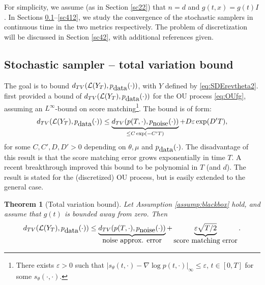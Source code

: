 \documentclass[letterpaper,11pt,reqno]{amsart}
\newtheorem{theorem}{Theorem}[section]
\numberwithin{equation}{section}
\begin{document}
\quad For simplicity, we assume (as in Section \ref{sc22}) that
$n = d$ and $g(t,x) = g(t) I$.
In Sections \ref{sc411}--\ref{sc412},
we study the convergence of the stochastic samplers in continuous time
in the two metrics respectively.
The problem of discretization will be discussed in Section \ref{sc42}, 
with additional references given.


\subsection{Stochastic sampler -- total variation bound}
\label{sc411}

The goal is to bound $d_{TV}(\mathcal{L}(Y_T), p_{\tiny \mbox{data}}(\cdot))$,
with $Y$ defined by \eqref{eq:SDErevtheta2}.
\cite{DV21} first provided a bound of $d_{TV}(\mathcal{L}(Y_T), p_{\tiny \mbox{data}}(\cdot))$ 
for the OU process \eqref{eq:OUfg}, 
assuming an $L^{\infty}$-bound on score matching\footnote{There exists $\varepsilon > 0$ such that 
$|s_\theta(t,\cdot) - \nabla \log p(t,\cdot)|_\infty \le \varepsilon$, $t \in [0,T]$
for some $s_\theta(\cdot, \cdot)$.}.
The bound is of form:
\begin{equation}
\label{eq:expTbad}
d_{TV}(\mathcal{L}(Y_T), p_{\tiny \mbox{data}}(\cdot))  \le \underbrace{d_{TV}(p(T, \cdot), p_{\tiny \mbox{noise}}(\cdot))}_{ \le C \exp(-C'T)} + D \varepsilon \exp(D' T),
\end{equation}
for some $C, C', D, D'> 0$ depending on $\theta, \mu$ and $p_{\tiny \mbox{data}}(\cdot)$.
The disadvantage of this result is that
the score matching error grows exponentially in time $T$.
A recent breakthrough \cite{Chen23} improved this bound
to be polynomial in $T$ (and $d$).
The result is stated for the (discretized) OU process, 
but is easily extended to the general case.
\begin{theorem}[Total variation bound]
\label{thm:Chen23}
\cite{Chen23}
Let Assumption \ref{assump:blackbox} hold, 
and assume that $g(t)$ is bounded away from zero.
Then
\begin{equation}
\label{eq:mainTVbd}
d_{TV}(\mathcal{L}(Y_T), p_{\tiny \mbox{data}}(\cdot))
\le \underbrace{d_{TV}(p(T, \cdot), p_{\tiny \mbox{noise}}(\cdot))}_{\tiny \mbox{noise approx. error}}  + \underbrace{\varepsilon \sqrt{T/2}}_{\tiny \mbox{score matching error}}.
\end{equation}
\end{theorem}
\end{document}
